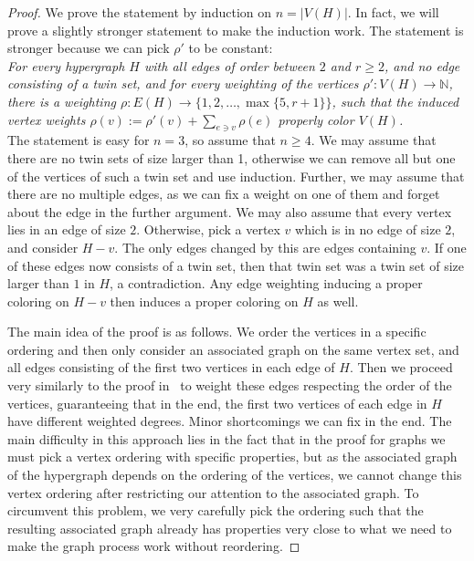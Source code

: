 \documentclass[reqno,12pt,epsf]{amsart}
\def\omm{\rho}
\def\N{\mathbb{N}}
\begin{document}
\begin{proof}
We prove the statement by induction on $n=|V(H)|$. 
In fact, we will prove a slightly stronger statement to make the induction work. The statement is stronger because we can pick $\omm'$ to be constant:\\

{\em 
For every hypergraph $H$ with all edges of order between $2$ and $r\ge 2$, and no edge consisting of a twin set, and for every weighting of the vertices $\omm ':V(H)\to \N$, there is a weighting $\omm: E(H)\to \{1,2,\ldots,\max\{5,r+1\}\}$,
such that the induced vertex weights $\omm(v):=\omm '(v)+\sum_{e\ni v}\omm(e)$ properly color $V(H)$.
}\\

The statement is easy for $n=3$, so assume that $n\ge 4$.
We may assume that there are no twin sets of size larger than 1, otherwise we can remove all but one of the vertices of such a twin set and use induction. Further, we may assume that there are no multiple edges, as we can fix a weight on one of them and forget about the edge in the further argument.
We may also assume that every vertex lies in an edge of size $2$. Otherwise, pick a vertex $v$ which is in no edge of size $2$, and consider $H-v$. The only edges changed by this are edges containing $v$. If one of these edges now consists of a twin set, then that twin set was a twin set of size larger than $1$ in $H$, a contradiction.
Any edge weighting inducing a proper coloring on $H-v$ then induces a proper coloring on $H$ as well. 

The main idea of the proof is as follows. We order the vertices in a specific ordering and then only consider an associated graph on the same vertex set, and  all edges consisting of the first two vertices in each edge of $H$. Then we proceed very similarly to the proof in~\cite{KKP} to weight these edges respecting the order of the vertices, guaranteeing that in the end, the first two vertices of each edge in $H$ have different weighted degrees. Minor shortcomings we can fix in the end.
The main difficulty in this approach lies in the fact that in the proof for graphs we must pick a vertex ordering with specific properties, but as the associated graph of the hypergraph depends on the ordering of the vertices, we cannot change this vertex ordering after restricting our attention to the associated graph. To circumvent this problem,
we very carefully pick the ordering such that the resulting associated graph already has properties very close to what we need to make the graph process work without reordering.



\end{proof}
\end{document}
